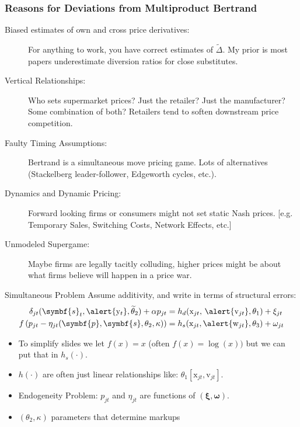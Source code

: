 \documentclass[aspectratio=169,10pt]{beamer}
\begin{document}
\begin{frame}
\frametitle{Reasons for Deviations from Multiproduct Bertrand}
\small
\begin{description}
\item[Biased estimates of own and cross price derivatives:] For anything to work, you have correct estimates of $\tilde{\Delta}$. My prior is most papers \alert{underestimate} diversion ratios for close substitutes.
\item[Vertical Relationships:] Who sets supermarket prices? Just the retailer? Just the manufacturer? Some combination of both? Retailers tend to \alert{soften} downstream price competition.
\item[Faulty Timing Assumptions:] Bertrand is a simultaneous move pricing game. Lots of alternatives (Stackelberg leader-follower, Edgeworth cycles, etc.).
\item[Dynamics and Dynamic Pricing:] Forward looking firms or consumers might not set static Nash prices. [e.g. Temporary Sales, Switching Costs, Network Effects, etc.]
\item[Unmodeled Supergame:] Maybe firms are legally tacitly colluding, higher prices might be about what firms believe will happen in a price war.
\end{description}
\end{frame}


\begin{frame}{Simultaneous Problem}
Assume additivity, and write in terms of structural errors:
\begin{align*}
\delta_{jt}(\symbf{s}_t,\alert{\mathrm{y}_t}, \widetilde{\theta}_2) + \alpha p_{jt} &= h_d(\textrm{x}_{jt}, \, \alert{\textrm{v}_{jt}},\theta_1)  + \xi_{jt} \\
 f \left( p_{jt} - \eta_{jt}(\symbf{p},\symbf{s},\theta_2,\kappa) \right) &= h_s(\textrm{x}_{jt}, \alert{\textrm{w}_{jt}},\theta_3) + \omega_{jt}
\end{align*}
\vspace{-.4cm}
\begin{itemize}
 \item To simplify slides we let $f(x)=x$ (often $f(x) =\log(x))$ but we can put that in $h_s(\cdot)$.
\item $h(\cdot)$ are often just linear relationships like: $\theta_1 [\textrm{x}_{jt}, \textrm{v}_{jt}]$.
\item Endogeneity Problem: $p_{jt}$ and $\eta_{jt}$ are functions of $(\symbf{\xi},\symbf{\omega})$.
\item $(\theta_2, \kappa)$ parameters that determine markups
\end{itemize}
\end{frame}
\end{document}
